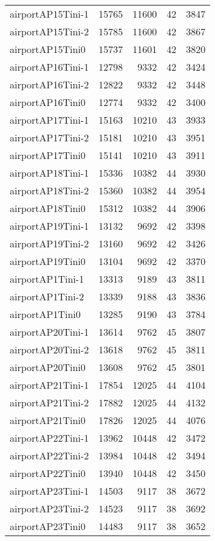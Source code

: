 \begin{tabular}{lrrrr}
airportAP15Tini-1 & 15765 & 11600 & 42 & 3847 \\
airportAP15Tini-2 & 15785 & 11600 & 42 & 3867 \\
airportAP15Tini0 & 15737 & 11601 & 42 & 3820 \\
airportAP16Tini-1 & 12798 & 9332 & 42 & 3424 \\
airportAP16Tini-2 & 12822 & 9332 & 42 & 3448 \\
airportAP16Tini0 & 12774 & 9332 & 42 & 3400 \\
airportAP17Tini-1 & 15163 & 10210 & 43 & 3933 \\
airportAP17Tini-2 & 15181 & 10210 & 43 & 3951 \\
airportAP17Tini0 & 15141 & 10210 & 43 & 3911 \\
airportAP18Tini-1 & 15336 & 10382 & 44 & 3930 \\
airportAP18Tini-2 & 15360 & 10382 & 44 & 3954 \\
airportAP18Tini0 & 15312 & 10382 & 44 & 3906 \\
airportAP19Tini-1 & 13132 & 9692 & 42 & 3398 \\
airportAP19Tini-2 & 13160 & 9692 & 42 & 3426 \\
airportAP19Tini0 & 13104 & 9692 & 42 & 3370 \\
airportAP1Tini-1 & 13313 & 9189 & 43 & 3811 \\
airportAP1Tini-2 & 13339 & 9188 & 43 & 3836 \\
airportAP1Tini0 & 13285 & 9190 & 43 & 3784 \\
airportAP20Tini-1 & 13614 & 9762 & 45 & 3807 \\
airportAP20Tini-2 & 13618 & 9762 & 45 & 3811 \\
airportAP20Tini0 & 13608 & 9762 & 45 & 3801 \\
airportAP21Tini-1 & 17854 & 12025 & 44 & 4104 \\
airportAP21Tini-2 & 17882 & 12025 & 44 & 4132 \\
airportAP21Tini0 & 17826 & 12025 & 44 & 4076 \\
airportAP22Tini-1 & 13962 & 10448 & 42 & 3472 \\
airportAP22Tini-2 & 13984 & 10448 & 42 & 3494 \\
airportAP22Tini0 & 13940 & 10448 & 42 & 3450 \\
airportAP23Tini-1 & 14503 & 9117 & 38 & 3672 \\
airportAP23Tini-2 & 14523 & 9117 & 38 & 3692 \\
airportAP23Tini0 & 14483 & 9117 & 38 & 3652 \\

\end{tabular}
